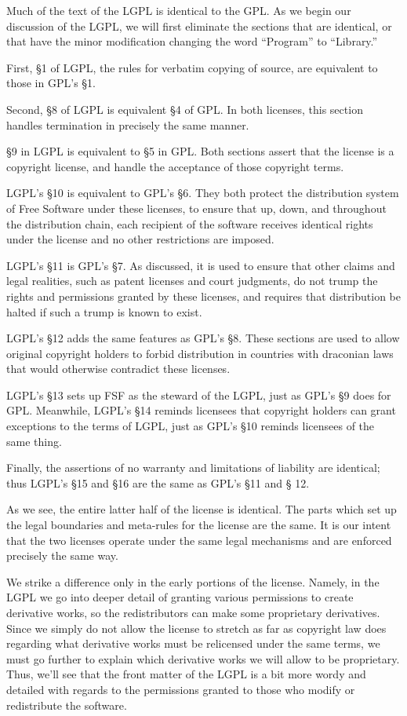Much of the text of the LGPL is identical to the GPL\@. As we begin our
discussion of the LGPL, we will first eliminate the sections that are
identical, or that have the minor modification changing the word
``Program'' to ``Library.''

First, \S 1 of LGPL, the rules for verbatim copying of source, are
equivalent to those in GPL's \S 1.

Second, \S 8 of LGPL is equivalent \S 4 of GPL\@. In both licenses, this
section handles termination in precisely the same manner.

\S 9 in LGPL is equivalent to \S 5 in GPL\@. Both sections assert that
the license is a copyright license, and handle the acceptance of those
copyright terms.

LGPL's \S 10 is equivalent to GPL's \S 6. They both protect the
distribution system of Free Software under these licenses, to ensure that
up, down, and throughout the distribution chain, each recipient of the
software receives identical rights under the license and no other
restrictions are imposed.

LGPL's \S 11 is GPL's \S 7. As discussed, it is used to ensure that
other claims and legal realities, such as patent licenses and court
judgments, do not trump the rights and permissions granted by these
licenses, and requires that distribution be halted if such a trump is
known to exist.

LGPL's \S 12 adds the same features as GPL's \S 8. These sections are
used to allow original copyright holders to forbid distribution in
countries with draconian laws that would otherwise contradict these
licenses.

LGPL's \S 13 sets up FSF as the steward of the LGPL, just as GPL's \S 9
does for GPL. Meanwhile, LGPL's \S 14 reminds licensees that copyright
holders can grant exceptions to the terms of LGPL, just as GPL's \S 10
reminds licensees of the same thing.

Finally, the assertions of no warranty and limitations of liability are
identical; thus LGPL's \S 15 and \S 16 are the same as GPL's \S 11 and \S
12.

As we see, the entire latter half of the license is identical.
The parts which set up the legal boundaries and meta-rules for the license
are the same. It is our intent that the two licenses operate under the
same legal mechanisms and are enforced precisely the same way.

We strike a difference only in the early portions of the license.
Namely, in the LGPL we go into deeper detail of granting various permissions to
create derivative works, so the redistributors can make
some proprietary derivatives. Since we simply do not allow the
license to stretch as far as copyright law does regarding what
derivative works must be relicensed under the same terms, we must go
further to explain which derivative works we will allow to be
proprietary. Thus, we'll see that the front matter of the LGPL is a
bit more wordy and detailed with regards to the permissions granted to
those who modify or redistribute the software.

